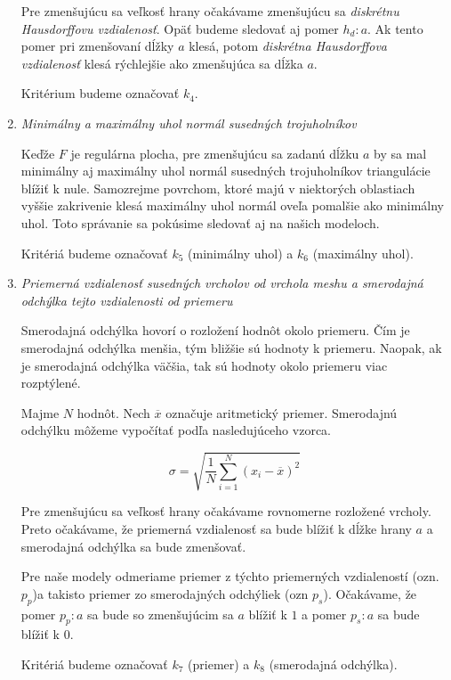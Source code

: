 \begin{enumerate}
{    Pre zmenšujúcu sa veľkosť hrany očakávame zmenšujúcu sa \textit{diskrétnu Hausdorffovu vzdialenosť}.
    Opäť budeme sledovať aj pomer $h_d : a$. Ak tento pomer pri zmenšovaní dĺžky $a$ klesá, potom 
    \textit{diskrétna Hausdorffova vzdialenosť} klesá rýchlejšie ako zmenšujúca sa dĺžka $a$.

    Kritérium budeme označovať $k_4$.
}
\item{
    \textit{Minimálny a maximálny uhol normál susedných trojuholníkov}

    Keďže $F$ je regulárna plocha, pre zmenšujúcu sa zadanú dĺžku $a$ by sa mal minimálny aj maximálny 
    uhol normál susedných trojuholníkov triangulácie blížiť k nule. Samozrejme povrchom, ktoré majú 
    v niektorých oblastiach vyššie zakrivenie klesá maximálny uhol normál oveľa pomalšie ako minimálny
    uhol. Toto správanie sa pokúsime sledovať aj na našich modeloch.

    Kritériá budeme označovať $k_5$ (minimálny uhol) a $k_6$ (maximálny uhol).
}
\item{
    \textit{Priemerná vzdialenosť susedných vrcholov od vrchola meshu a smerodajná odchýlka tejto vzdialenosti od priemeru}

    Smerodajná odchýlka hovorí o rozložení hodnôt okolo priemeru. Čím je smerodajná odchýlka menšia, 
    tým bližšie sú hodnoty k priemeru. Naopak, ak je smerodajná odchýlka väčšia, tak sú hodnoty okolo
    priemeru viac rozptýlené.
    
    Majme $N$ hodnôt. Nech $\overline{x}$ označuje aritmetický priemer. 
    Smerodajnú odchýlku môžeme vypočítať podľa nasledujúceho vzorca.

    \begin{equation}
    \label{eq:std}
    \sigma = \sqrt{\frac{1}{N} \sum\limits_{i=1}^{N}(x_i - \overline{x})^2} 
    \end{equation}

    Pre zmenšujúcu sa veľkosť hrany očakávame rovnomerne rozložené vrcholy. Preto očakávame, že 
    priemerná vzdialenosť sa bude blížiť k dĺžke hrany $a$ a smerodajná odchýlka sa bude zmenšovať.
    
    Pre naše modely odmeriame priemer z týchto priemerných vzdialeností (ozn. $p_p$)a takisto priemer 
    zo smerodajných odchýliek (ozn $p_s$). Očakávame, že pomer $p_p : a$ sa bude so zmenšujúcim sa $a$
    blížiť k $1$ a pomer $p_s : a$ sa bude blížiť k $0$.

    Kritériá budeme označovať $k_7$ (priemer) a $k_8$ (smerodajná odchýlka).
}
\end{enumerate}

